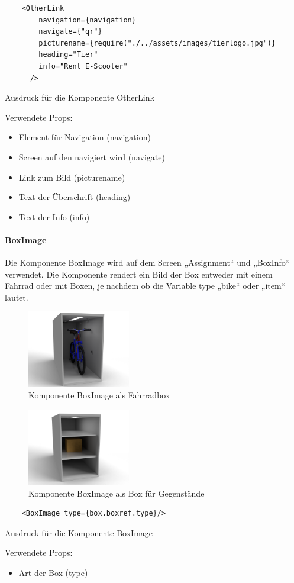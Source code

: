 \begin{listing}
  
\begin{verbatim}
    <OtherLink
        navigation={navigation}
        navigate={"qr"}
        picturename={require("./../assets/images/tierlogo.jpg")}
        heading="Tier"
        info="Rent E-Scooter"
      />
\end{verbatim}
\caption{Ausdruck für die Komponente OtherLink}
\label{lst:jsxotherlink}
\end{listing}
Verwendete Props:
\begin{itemize}
  \item Element für Navigation (navigation)
  \item Screen auf den navigiert wird (navigate)
  \item Link zum Bild (picturename)
  \item Text der Überschrift (heading)
  \item Text der Info (info)
\end{itemize}


\paragraph{BoxImage}Die Komponente BoxImage wird auf dem Screen „Assignment“ und „BoxInfo“ verwendet. Die Komponente rendert ein Bild der Box entweder mit einem Fahrrad oder mit Boxen, je nachdem ob die Variable type „bike“ oder „item“ lautet.\\
\begin{figure}[H]
  \centering
  \includegraphics[width=0.4\textwidth]{images/box_bike.png}
  \caption{Komponente BoxImage als Fahrradbox}
  \label{fig:boximagebike}
\end{figure}
\begin{figure}[H]
  \centering
  \includegraphics[width=0.4\textwidth]{images/box_item.png}
  \caption{Komponente BoxImage als Box für Gegenstände}
  \label{fig:boximageitem}
\end{figure}

\begin{listing}
\begin{verbatim}
    <BoxImage type={box.boxref.type}/>
\end{verbatim}
\caption{Ausdruck für die Komponente BoxImage}
\label{lst:jsxboximage}
\end{listing}
Verwendete Props:
\begin{itemize}
  \item Art der Box (type)
\end{itemize}
